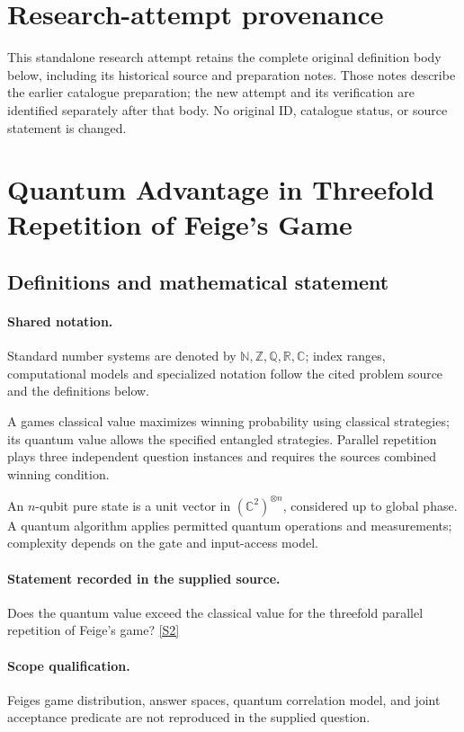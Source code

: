 \documentclass[11pt]{article}
\begin{document}
\section*{Research-attempt provenance}
This standalone research attempt retains the complete original definition body below,
including its historical source and preparation notes. Those notes describe the
earlier catalogue preparation; the new attempt and its verification are identified
separately after that body. No original ID, catalogue status, or source statement is changed.

\section{Quantum Advantage in Threefold Repetition of Feige’s Game}\label{statement}

\subsection{Definitions and mathematical statement}

\paragraph{Shared notation.}Standard number systems are denoted by $\mathbb N,\mathbb Z,\mathbb Q,\mathbb R,\mathbb C$; index ranges, computational models and specialized notation follow the cited problem source and the definitions below.


A game\textquotesingle s classical value maximizes winning probability using classical strategies; its quantum value allows the specified entangled strategies. Parallel repetition plays three independent question instances and requires the source\textquotesingle s combined winning condition.

An $n$-qubit pure state is a unit vector in $(\mathbb C^2)^{\otimes n}$, considered up to global phase. A quantum algorithm applies permitted quantum operations and measurements; complexity depends on the gate and input-access model.
\paragraph{Statement recorded in the supplied source.}
Does the quantum value exceed the classical value for the threefold parallel repetition of Feige’s game? \href{https://doi.org/10.4171/owr/2026/4}{[S2]}
\paragraph{Scope qualification.}
Feige\textquotesingle s game distribution, answer spaces, quantum correlation model, and joint acceptance predicate are not reproduced in the supplied question.
\end{document}
